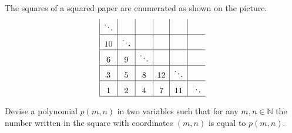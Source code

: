 The squares of a squared paper are enumerated as shown on the picture.\[\begin{array}{|c|c|c|c|c|c}

\ddots &&&&&\\ \hline

10&\ddots&&&&\\ \hline

6&9&\ddots&&&\\ \hline

3&5&8&12&\ddots&\\ \hline

1&2&4&7&11&\ddots\\ \hline

\end{array}\]

Devise a polynomial $p(m, n)$ in two variables such that for any $m, n \in \mathbb{N}$ the number written in the square with coordinates $(m, n)$ is equal to $p(m, n)$.